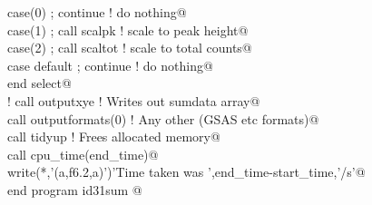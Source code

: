 \documentclass[10pt,a4paper,notitlepage]{article}
\begin{document}
\begin{flushleft}
\begin{minipage}{\linewidth}
\begin{list}{}{}
\mbox{}\verb@      case(0) ; continue                     ! do nothing@\\
\mbox{}\verb@      case(1) ; call scalpk        ! scale to peak height@\\
\mbox{}\verb@      case(2) ; call scaltot       ! scale to total counts@\\
\mbox{}\verb@      case default ; continue               ! do nothing@\\
\mbox{}\verb@      end select@\\
\mbox{}\verb@!     call outputxye                           ! Writes out sumdata array@\\
\mbox{}\verb@      call outputformats(0)                ! Any other (GSAS etc formats)@\\
\mbox{}\verb@      call tidyup                                ! Frees allocated memory@\\
\mbox{}\verb@      call cpu_time(end_time)@\\
\mbox{}\verb@      write(*,'(a,f6.2,a)')'Time taken was ',end_time-start_time,'/s'@\\
\mbox{}\verb@      end program id31sum                                                    @{\NWsep}
\end{list}
\vspace{-1.5ex}
\footnotesize
\begin{list}{}{\setlength{\itemsep}{-\parsep}\setlength{\itemindent}{-\leftmargin}}

\item{}
\end{list}
\end{minipage}\vspace{4ex}
\end{flushleft}
\end{document}
